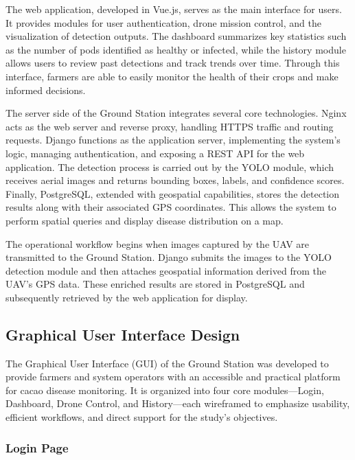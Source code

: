 The web application, developed in Vue.js, serves as the main interface for users. It provides modules for user authentication, drone mission control, and the visualization of detection outputs. The dashboard summarizes key statistics such as the number of pods identified as healthy or infected, while the history module allows users to review past detections and track trends over time. Through this interface, farmers are able to easily monitor the health of their crops and make informed decisions.

The server side of the Ground Station integrates several core technologies. Nginx acts as the web server and reverse proxy, handling HTTPS traffic and routing requests. Django functions as the application server, implementing the system’s logic, managing authentication, and exposing a REST API for the web application. The detection process is carried out by the YOLO module, which receives aerial images and returns bounding boxes, labels, and confidence scores. Finally, PostgreSQL, extended with geospatial capabilities, stores the detection results along with their associated GPS coordinates. This allows the system to perform spatial queries and display disease distribution on a map.

The operational workflow begins when images captured by the UAV are transmitted to the Ground Station. Django submits the images to the YOLO detection module and then attaches geospatial information derived from the UAV’s GPS data. These enriched results are stored in PostgreSQL and subsequently retrieved by the web application for display.

\subsection*{Graphical User Interface Design}

The Graphical User Interface (GUI) of the Ground Station was developed to provide farmers and system operators with an accessible and practical platform for cacao disease monitoring. It is organized into four core modules—Login, Dashboard, Drone Control, and History—each wireframed to emphasize usability, efficient workflows, and direct support for the study’s objectives.

\subsubsection*{Login Page}

